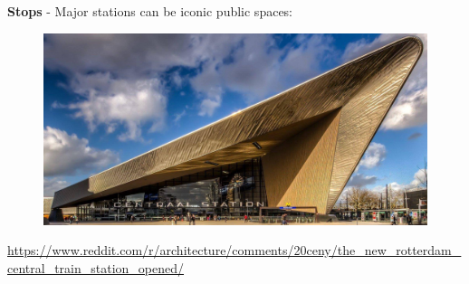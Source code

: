 \documentclass[aspectratio=169]{beamer}
\begin{document}
\begin{frame}
	
	\textbf{Stops} - Major stations can be iconic public spaces:
	
	\begin{figure}
		\centering
		\includegraphics[width=0.98\linewidth]{images/rotterdam.jpg}
	\end{figure}

	\tiny\url{https://www.reddit.com/r/architecture/comments/20ceny/the_new_rotterdam_central_train_station_opened/}
	
\end{frame}
\end{document}
